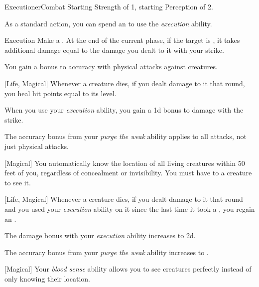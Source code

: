     \begin{feat}{Executioner}{Combat}
        \featpres Starting Strength of 1, starting Perception of 2.

         As a standard action, you can spend an  to use the \textit{execution} ability.
        \begin{ability}{Execution}
            Make a .
            At the end of the current phase, if the target is , it takes additional damage equal to the damage you dealt to it with your strike.
        \end{ability}

         You gain a  bonus to accuracy with physical attacks against  creatures.

        [Life, Magical] Whenever a creature dies, if you dealt damage to it that round, you heal hit points equal to its level.

         When you use your \textit{execution} ability, you gain a \plus1d bonus to damage with the strike.

         The accuracy bonus from your \textit{purge the weak} ability applies to all attacks, not just physical attacks.

        [Magical] You automatically know the location of all living creatures within 50 feet of you, regardless of concealment or invisibility.
        You must have  to a creature to see it.

        [Life, Magical] Whenever a creature dies, if you dealt damage to it that round and you used your \textit{execution} ability on it since the last time it took a , you regain an .

         The damage bonus with your \textit{execution} ability increases to \plus2d.

         The accuracy bonus from your \textit{purge the weak} ability increases to .

        [Magical] Your \textit{blood sense} ability allows you to see creatures perfectly instead of only knowing their location.
    \end{feat}

